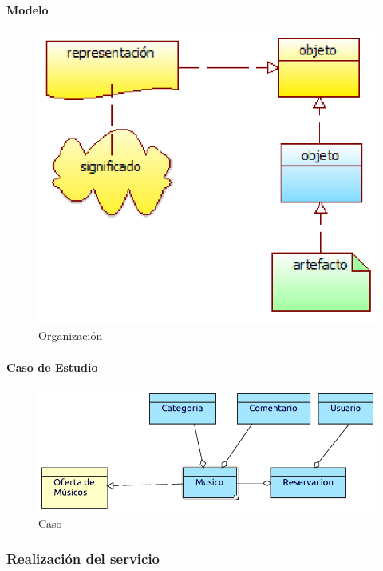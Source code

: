 \paragraph{Modelo}
\begin{figure}[h!]
	\centering
	\includegraphics[width=0.8\linewidth]{Desarrollo/ArquitecturaEmpresarial/Tecnologia/imgs/estructuraMetamodelo.PNG}
	\caption{Organización}
\end{figure}
\newpage
\paragraph{Caso de Estudio}

\begin{figure}[h!]
	\centering
	\includegraphics[width=\linewidth]{Desarrollo/ArquitecturaEmpresarial/Tecnologia/imgs/estructura.pdf}
	\caption{Caso}
\end{figure}

\newpage

\subsubsection{Realización del servicio}
